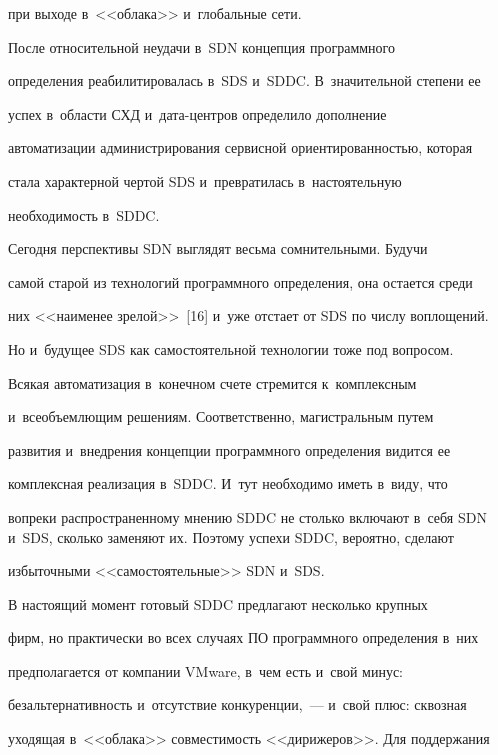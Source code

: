 при выходе в~<<облака>> и~глобальные сети.


    


    После относительной неудачи в~SDN концепция программного 


определения реабилитировалась в~SDS и~SDDC. В~значительной степени ее 


успех в~об\-ласти СХД и~да\-та-цент\-ров определило дополнение 


автоматизации администрирования сервисной ори\-ен\-ти\-ро\-ван\-ностью, которая 


стала характерной чер\-той SDS и~превратилась в~на\-сто\-ятель\-ную 


не\-об\-хо\-ди\-мость в~SDDC.


    


    Сегодня перспективы SDN выглядят весьма сомнительными. Будучи 


самой старой из технологий программного определения, она остается среди 


них <<наименее зрелой>>~[16] и~уже отстает от SDS по числу воплощений. 


Но и~будущее SDS как самостоятельной технологии тоже под вопросом. 


Всякая автоматизация в~конечном счете стремится к~комплексным 


и~всеобъемлющим решениям. Соответственно, магистральным путем 


развития и~внед\-ре\-ния концепции программного определения видится ее 


комплексная реализация в~SDDC. И~тут необходимо иметь в~виду, что 


вопреки распространенному мнению SDDC не столько включают в~себя SDN и~SDS, сколько заменяют их. Поэтому успехи SDDC, вероятно, сделают 


избыточными <<самостоятельные>> SDN и~SDS.


    


    В настоящий момент готовый SDDC предлагают несколько крупных 


фирм, но практически во всех случаях ПО программного определения в~них 


предполагается от компании VMware, в~чем есть и~свой минус: 


безальтернативность и~отсутствие конкуренции,~--- и~свой плюс: сквозная 


уходящая в~<<облака>> со\-вмес\-ти\-мость <<дирижеров>>. Для поддержания 


